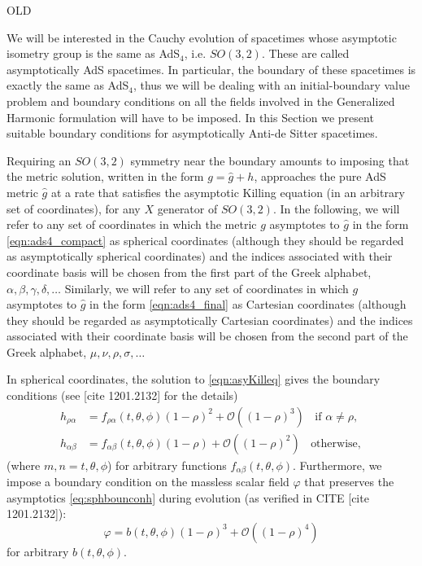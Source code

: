 \documentclass[a4paper,11pt]{article}
\numberwithin{equation}{section}
\begin{document}
\iffalse
OLD

We will be interested in the Cauchy evolution of spacetimes whose asymptotic isometry group is the same as AdS$_4$, i.e. $SO(3,2)$. These are called asymptotically AdS spacetimes. In particular, the boundary of these spacetimes is exactly the same as AdS$_4$, thus we will be dealing with an initial-boundary value problem and boundary conditions on all the fields involved in the Generalized Harmonic formulation will have to be imposed.
In this Section we present suitable boundary conditions for asymptotically Anti-de Sitter spacetimes.

Requiring an $SO(3,2)$ symmetry near the boundary amounts to imposing that the metric solution, written in the form $g=\hat{g}+h$, approaches the pure AdS metric $\hat{g}$ at a rate that satisfies the asymptotic Killing equation (in an arbitrary set of coordinates), 
for any $X$ generator of $SO(3,2)$. 
In the following, we will refer to any set of coordinates in which the metric $g$ asymptotes to $\hat{g}$ in the form \eqref{eqn:ads4_compact} as spherical coordinates (although they should be regarded as asymptotically spherical coordinates) and the indices associated with their coordinate basis will be chosen from the first part of the Greek alphabet, $\alpha,\beta,\gamma,\delta,\dots$
Similarly, we will refer to any set of coordinates in which $g$ asymptotes to $\hat{g}$ in the form \eqref{eqn:ads4_final} as Cartesian coordinates (although they should be regarded as asymptotically Cartesian coordinates) and the indices associated with their coordinate basis will be chosen from the second part of the Greek alphabet, $\mu,\nu,\rho,\sigma,\dots$

In spherical coordinates, the solution to \eqref{eqn:asyKilleq} gives the boundary conditions (see [cite 1201.2132] for the details)
\begin{eqnarray}
\label{eq:sphbounconh}
h_{\rho\alpha}&=f_{\rho\alpha}(t,\theta,\phi)(1-\rho)^2+\mathcal{O}((1-\rho)^3) \;\; \textrm{ if $\alpha\neq\rho$}, \\ \nonumber
h_{\alpha\beta}&=f_{\alpha\beta}(t,\theta,\phi)(1-\rho)+\mathcal{O}((1-\rho)^{2}) \;\; \textrm{ otherwise},
\end{eqnarray}
(where $m,n=t,\theta,\phi$) for arbitrary functions $f_{\alpha\beta}(t,\theta,\phi)$. Furthermore, we impose a boundary condition on the massless scalar field $\varphi$ that preserves the asymptotics \eqref{eq:sphbounconh} during evolution (as verified in CITE [cite 1201.2132]):
\begin{equation}\label{eq:sphbounconphi}
\varphi=b(t,\theta,\phi)(1-\rho)^3+\mathcal{O}((1-\rho)^4)
\end{equation}
for arbitrary $b(t,\theta,\phi)$.
\end{document}
